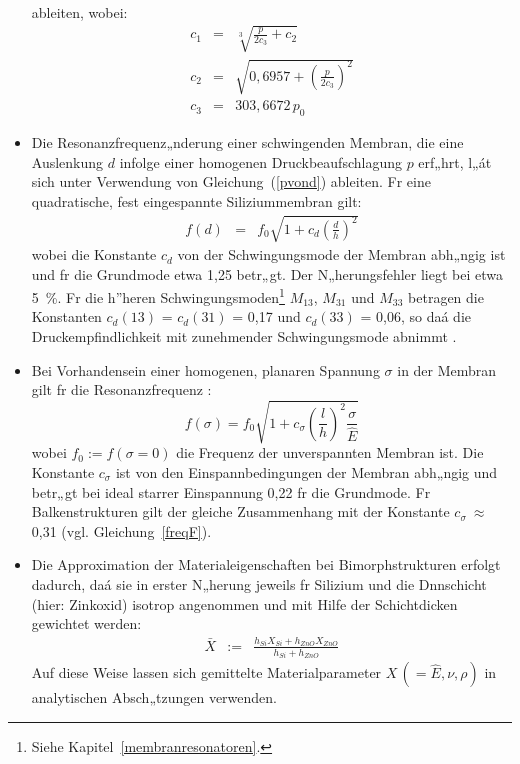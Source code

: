 \begin{itemize}
\begin{eqnarray}
\end{eqnarray}
ableiten, wobei:
\begin{eqnarray}
 c_{1}       & = & \sqrt [3] {\frac{p}{2c_{3}} + c_{2} }
\nonumber \\
 c_{2}       & = & \sqrt{0,6957 + {\left( \frac{p}{2c_{3}} \right)}^2}
\nonumber \\
 c_{3}       & = & 303,6672 \, p_{0}
\nonumber
\end{eqnarray}
%
\item Die Resonanzfrequenz„nderung einer schwingenden Membran, die eine
Auslenkung $d$ infolge einer homogenen Druckbeaufschlagung $p$ erf„hrt,
l„át sich unter Verwendung von Gleichung~(\ref{pvond}) ableiten. Fr eine
quadratische, fest eingespannte Siliziummembran gilt:
\begin{eqnarray}
\label{fvondschroth}
  f(d) & = & f_{0} \sqrt{1 + c_{d} {\left( \frac{d}{h} \right)}^{2}}
\end{eqnarray}
wobei die Konstante $c_{d}$ von der Schwingungsmode der Membran abh„ngig
ist und fr die Grundmode etwa 1,25 betr„gt. Der N„herungsfehler liegt bei
etwa 5~\%. Fr die h”heren Schwingungsmoden\footnote{Siehe
Kapitel~\ref{membranresonatoren}.} $M_{13}$, $M_{31}$ und $M_{33}$
betragen die Konstanten $c_{d}(13)$ = $c_{d}(31)$ = 0,17 und
$c_{d}(33)$ = 0,06, so daá die Druckempfindlichkeit mit zunehmender
Schwingungsmode abnimmt \cite{Fab92a}.
%
\item Bei Vorhandensein einer homogenen, planaren Spannung $\sigma$ in der
Membran gilt fr die Resonanzfrequenz \cite{Bou90}:
\begin{equation}
\label{fsigma}
  f(\sigma) = f_{0} \sqrt{1 + c_{\sigma}
                {\left( \frac{l}{h} \right)}^{2} \frac{\sigma}{\hat E}}
\end{equation}
wobei $f_{0} := f(\sigma = 0)$ die Frequenz der unverspannten Membran ist.
Die Konstante $c_{\sigma}$ ist von den Einspannbedingungen der Membran
abh„ngig und betr„gt bei ideal starrer Einspannung 0,22 fr die Grundmode.
Fr Balkenstrukturen gilt der gleiche Zusammenhang mit der Konstante
$c_{\sigma}~\approx~$0,31 %
(vgl. Gleichung~\ref{freqF}).
%
\item Die Approximation der Materialeigenschaften bei Bimorphstrukturen
erfolgt dadurch, daá sie in erster N„herung jeweils fr Silizium
und die Dnnschicht (hier: Zinkoxid) isotrop angenommen
und mit Hilfe der Schichtdicken gewichtet werden:
\begin{eqnarray}
\label{matwich}
 \bar X & := & \frac{h_{Si}X_{Si} + h_{ZnO}X_{ZnO}}
                    {h_{Si} + h_{ZnO}}
\end{eqnarray}
Auf diese Weise lassen sich gemittelte Materialparameter
$X \, (= \hat E, \nu, \rho)$ in analytischen Absch„tzungen verwenden.
\end{itemize}


